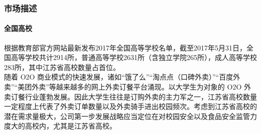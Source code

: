 \documentclass[violet]{main}
\begin{document}
			\subsubsection{市场描述}
				\paragraph{全国高校}
					根据教育部官方网站最新发布2017年全国高等学校名单，截至2017年5月31日，全国高等学校共计2914所，普通高等学校2631所（含独立学院265所），成人高等学校283所，其中江苏省高校数量占首位。
					\\\indent 随着 O2O 商业模式的快速发展，诸如“饿了么”“淘点点（口碑外卖）”“百度外卖”“美团外卖”等越来越多的网上外卖订餐平台涌现。以大学生为对象的 O2O 外卖订餐行业蓬勃发展。因此大学生往往是订购外卖的主力军之一，江苏省高校数量一定程度上代表了外卖订单数量以及外卖骑手进出校园频次。考虑到江苏省高校的潜在需求量极大，公司第一步发展战略应当定位在对校园安全以及食品安全监管力度大的高校内，尤其是江苏省高校。
\end{document}
